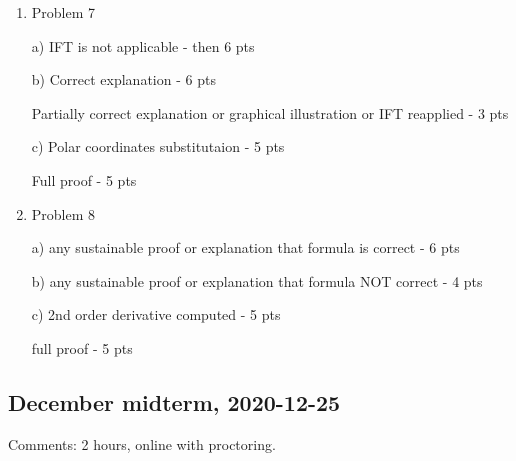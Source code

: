 \begin{enumerate}
    
    
    \item Problem 7
    
    a) IFT is not applicable - then 6 pts
    
    b) Correct explanation - 6 pts
        
        Partially correct explanation or graphical illustration or IFT reapplied - 3 pts
    
    c) Polar coordinates substitutaion - 5 pts
        
        Full proof - 5 pts

    \item Problem 8
    
    a) any sustainable proof or explanation that formula is correct - 6 pts
    
    b) any sustainable proof or explanation that formula NOT correct - 4 pts
    
    c) 2nd order derivative computed - 5 pts
    
        full proof - 5 pts


\end{enumerate}


\subsection{December midterm, 2020-12-25}

Comments: 2 hours, online with proctoring. 



